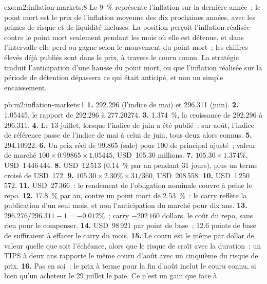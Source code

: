\begin{solution}{exo:m2:inflation-markets:8}
Le 9~\% représente l'inflation sur la dernière année~; le point mort est le prix de
l'inflation moyenne des dix prochaines années, avec les primes de risque et de liquidité incluses. La
position perçoit l'inflation réalisée contre le point mort seulement pendant les mois
où elle est détenue, et dans l'intervalle elle perd ou gagne selon le mouvement du point mort~; les
chiffres élevés déjà publiés sont dans le prix, à travers le couru connu.
La stratégie traduit l'anticipation d'une hausse du point mort, ou que l'inflation réalisée
sur la période de détention dépassera ce qui était anticipé, et non un simple encaissement.
\end{solution}

\begin{solution}{pb:m2:inflation-markets:1}
\textbf{1.} 292.296 (l'indice de mai) et 296.311 (juin).
\textbf{2.} 1.05445, le rapport de 292.296 à 277.20274.
\textbf{3.} 1.374~\%, la croissance de 292.296 à 296.311.
\textbf{4.} Le 13 juillet, lorsque l'indice de juin a été publié~: sur août, l'indice
de référence passe de l'indice de mai à celui de juin, tous deux alors connus.
\textbf{5.} 294.10922.
\textbf{6.} Un prix réel de 99.865 (sale) pour 100 de principal ajusté~; valeur de marché
$100 \times 0.99865 \times 1.05445$, USD~105.30 millions.
\textbf{7.} $105.30 \times 1.374\%$, USD~1\,446\,444.
\textbf{8.} USD~12\,513 (0.14~\% par an pendant 31 jours), plus un terme croisé de USD~172.
\textbf{9.} $105.30 \times 2.30\% \times 31/360$, USD~208\,558.
\textbf{10.} USD~1\,250\,572.
\textbf{11.} USD~27\,366~: le rendement de l'obligation nominale couvre à peine le repo.
\textbf{12.} 17.8~\% par an, contre un point mort de 2.53~\%~: le carry reflète la
publication d'un seul mois, et non l'anticipation du marché pour dix ans.
\textbf{13.} $296.276/296.311 - 1 = -0.012\%$~; carry $-202\,160$ dollars, le
coût du repo, sans rien pour le compenser.
\textbf{14.} USD~98\,921 par point de base~; 12.6 points de base de  suffiraient à
effacer le carry du mois.
\textbf{15.} Le couru est le même par dollar de valeur quelle que soit l'échéance, alors que
le risque de  croît avec la duration~: un TIPS à deux ans rapporte le même
couru d'août avec un cinquième du risque de prix.
\textbf{16.} Pas en soi~: le prix à terme pour la fin d'août inclut le
couru connu, si bien qu'un acheteur le 29 juillet le paie. Ce n'est un gain que face à

\end{solution}
